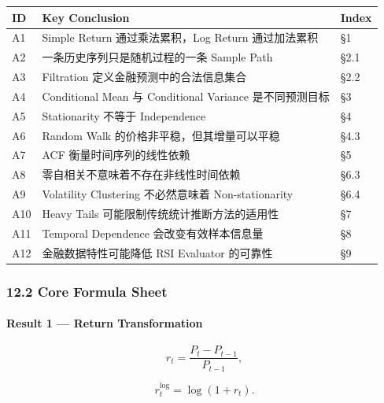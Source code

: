 \begin{readertable}
\begin{longtable}[]{@{}
  >{\raggedright\arraybackslash}p{}
  >{\raggedright\arraybackslash}p{}
  >{\raggedright\arraybackslash}p{}@{}}
\toprule
ID & Key Conclusion & Index \\
\midrule
\endhead
A1 & Simple Return 通过乘法累积，Log Return 通过加法累积 & §1 \\
A2 & 一条历史序列只是随机过程的一条 Sample Path & §2.1 \\
A3 & Filtration 定义金融预测中的合法信息集合 & §2.2 \\
A4 & Conditional Mean 与 Conditional Variance 是不同预测目标 & §3 \\
A5 & Stationarity 不等于 Independence & §4 \\
A6 & Random Walk 的价格非平稳，但其增量可以平稳 & §4.3 \\
A7 & ACF 衡量时间序列的线性依赖 & §5 \\
A8 & 零自相关不意味着不存在非线性时间依赖 & §6.3 \\
A9 & Volatility Clustering 不必然意味着 Non-stationarity & §6.4 \\
A10 & Heavy Tails 可能限制传统统计推断方法的适用性 & §7 \\
A11 & Temporal Dependence 会改变有效样本信息量 & §8 \\
A12 & 金融数据特性可能降低 RSI Evaluator 的可靠性 & §9 \\
\bottomrule
\end{longtable}
\end{readertable}

\hypertarget{part-4-58-0007-core-formula-sheet}{%
\subsubsection{12.2 Core Formula Sheet}\label{part-4-58-0007-core-formula-sheet}}

\hypertarget{part-4-58-0007-result-1-return-transformation}{%
\paragraph{Result 1 --- Return Transformation}\label{part-4-58-0007-result-1-return-transformation}}

\[r_t=\frac{P_t-P_{t-1}}{P_{t-1}},\]

\[r_t^{\log}=\log(1+r_t).\]

